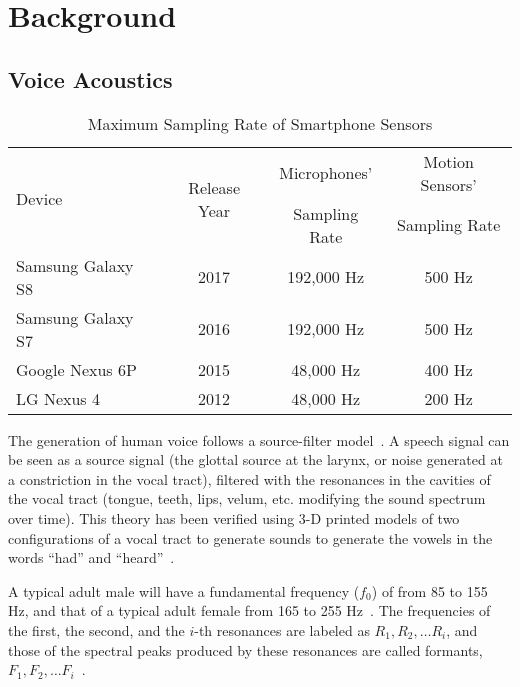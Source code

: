 \section{Background}

\subsection{Voice Acoustics}\label{sec:movovoice}
\begin{table*}[h]
	\centering
	\caption[]{Maximum Sampling Rate of Smartphone Sensors}
	\label{tab:samplerate}
	\begin{tabular}{lccc} %
		\toprule		
		\multirow{2}{3cm}{Device}& \multirow{2}{2.5cm}{Release Year } & Microphones' & Motion Sensors' \\
		& & Sampling Rate & Sampling Rate\footnotemark \\
		\midrule
		Samsung Galaxy S8 & 2017 & 192,000 Hz & 500 Hz\\
		Samsung Galaxy S7 & 2016 & 192,000 Hz & 500 Hz\\		
		Google Nexus 6P & 2015 & 48,000 Hz & 400 Hz\\
		LG Nexus 4 & 2012 & 48,000 Hz& 200 Hz\\
		\bottomrule
	\end{tabular}
\end{table*}


The generation of human voice follows a source-filter model~\cite{fant1960acoustic}. A speech signal can be seen as a source signal (the glottal source at the larynx, or noise generated at a constriction in the vocal tract), filtered with the resonances in the cavities of the vocal tract (tongue, teeth, lips, velum, etc. modifying the sound spectrum over time). This theory has been verified using 3-D printed models of two configurations of a vocal tract to generate sounds to generate the vowels in the words ``had'' and ``heard''~\cite{wolfe2016experimentally}. 


A typical adult male will have a fundamental frequency ($f_0$) of from 85 to 155 Hz, and that of a typical adult female from 165 to 255 Hz~\cite{baken1987clinical,titze1994principles}. The frequencies of the first, the second, and the $i$-th resonances are labeled as $R_1, R_2, \ldots R_i$, and those of the spectral peaks produced by these resonances are called formants, $F_1, F_2, \ldots F_i $~\cite{titze2015toward}. 

